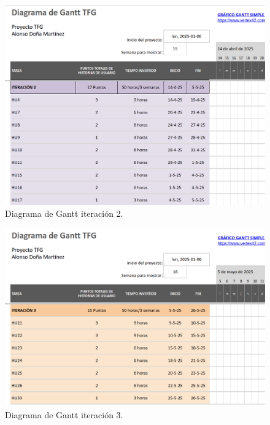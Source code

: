 \begin{figure}[H]
    \centering
    \includegraphics[width=1\textwidth]{fotos/iter2.png}
    \caption{Diagrama de Gantt iteración 2\textbf{}.}
    \label{fig:gantt2}
\end{figure}
\begin{figure}[H]
    \centering
    \includegraphics[width=1\textwidth]{fotos/iter3.png}
    \caption{Diagrama de Gantt iteración 3\textbf{}.}
    \label{fig:gantt3}
\end{figure}
